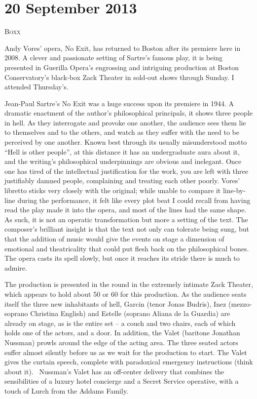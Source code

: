\chapter{20 September 2013}

\textsc{Boxx}

Andy Vores’ opera, No Exit, has returned to Boston after its premiere here in 2008. A clever and passionate setting of Sartre’s famous play, it is being presented in Guerilla Opera's engrossing and intriguing production at Boston Conservatory’s black-box Zack Theater in sold-out shows through Sunday. I attended Thursday’s.

Jean-Paul Sartre’s No Exit was a huge success upon its premiere in 1944. A dramatic enactment of the author’s philosophical principals, it shows three people in hell. As they interrogate and provoke one another, the audience sees them lie to themselves and to the others, and watch as they suffer with the need to be perceived by one another. Known best through its usually misunderstood motto “Hell is other people”, at this distance it has an undergraduate aura about it, and the writing’s philosophical underpinnings are obvious and inelegant. Once one has tired of the intellectual justification for the work, you are left with three justifiably damned people, complaining and treating each other poorly. Vores’ libretto sticks very closely with the original; while unable to compare it line-by-line during the performance, it felt like every plot beat I could recall from having read the play made it into the opera, and most of the lines had the same shape. As such, it is not an operatic transformation but more a setting of the text. The composer’s brilliant insight is that the text not only can tolerate being sung, but that the addition of music would give the events on stage a dimension of emotional and theatricality that could put flesh back on the philosophical bones. The opera casts its spell slowly, but once it reaches its stride there is much to admire.

The production is presented in the round in the extremely intimate Zack Theater, which appears to hold about 50 or 60 for this production. As the audience seats itself the three new inhabitants of hell, Garcin (tenor Jonas Budris), Inez (mezzo-soprano Christina English) and Estelle (soprano Aliana de la Guardia) are already on stage, as is the entire set – a couch and two chairs, each of which holds one of the actors, and a door. In addition, the Valet (baritone Jonathan Nussman) prowls around the edge of the acting area. The three seated actors suffer almost silently before us as we wait for the production to start. The Valet gives the curtain speech, complete with paradoxical emergency instructions (think about it).  Nussman’s Valet has an off-center delivery that combines the sensibilities of a luxury hotel concierge and a Secret Service operative, with a touch of Lurch from the Addams Family.

